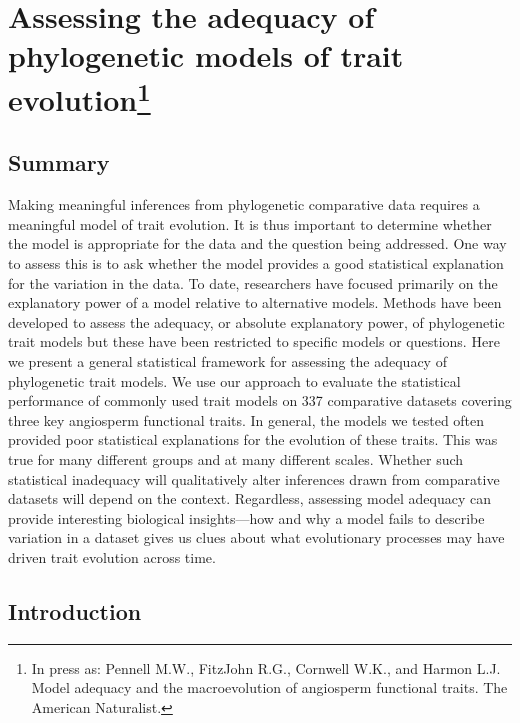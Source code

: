 \chapter[Assessing the adequacy of phylogenetic models of trait evolution]{Assessing the adequacy of phylogenetic models of trait evolution\footnote {In press as: Pennell M.W., FitzJohn R.G., Cornwell W.K., and Harmon L.J.
  Model adequacy and the macroevolution of angiosperm functional traits.
  The American Naturalist.}}
\label{chap:modeladequacy}

\section{Summary}
Making meaningful inferences from phylogenetic comparative data requires a meaningful model of trait evolution. It is thus important to determine whether the model is appropriate for the data and the question being addressed. One way to assess this is to ask whether the model provides a good statistical explanation for the variation in the data. To date, researchers have focused primarily on the explanatory power of a model relative to alternative models. Methods have been developed to assess the adequacy, or absolute explanatory power, of phylogenetic trait models but these have been restricted to specific models or questions. Here we present a general statistical framework for assessing the adequacy of phylogenetic trait models. We use our approach to evaluate the statistical performance of commonly used trait models on 337 comparative datasets covering three key angiosperm functional traits. In general, the models we tested often provided poor statistical explanations for the evolution of these traits. This was true for many different groups and at many different scales. Whether such statistical inadequacy will qualitatively alter inferences drawn from comparative datasets will depend on the context. Regardless, assessing model adequacy can provide interesting biological insights---how and why a model fails to describe variation in a dataset gives us clues about what evolutionary processes may have driven trait evolution across time.

\section{Introduction}

